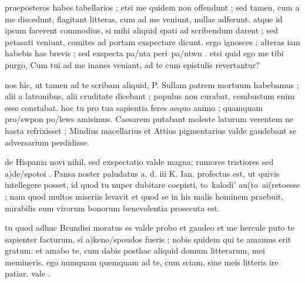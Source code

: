 


 praeposteros habes tabellarios ; etsi me quidem non offendunt ; sed tamen, cum a me discedunt, flagitant litteras, cum ad me veniunt, nullas adferunt. atque id ipsum facerent commodius, si mihi aliquid spati ad scribendum darent ; sed petasati veniunt, comites ad portam exspectare dicunt. ergo ignosces ; alteras iam habebis has brevis ; sed exspecta pa/nta peri\ pa/ntwn . etsi quid ego me tibi purgo, Cum tui ad me inanes veniant, ad te cum epistulis revertantur?

 nos hic, ut tamen ad te scribam aliquid, P. Sullam patrem mortuum habebamus ; alii a latronibus, alii cruditate dicebant ; populus non curabat, combustum enim esse constabat. hoc tu pro tua sapientia feres aequo animo ; quamquam pro/swpon po/lews amisimus. Caesarem putabant moleste laturum verentem ne hasta refrixisset ; Mindius macellarius et Attius pigmentarius valde gaudebant se adversarium perdidisse.

 de Hispania novi nihil, sed exspectatio valde magna; rumores tristiores sed a)de/spotoi . Pansa noster paludatus a. d. iii K. Ian. profectus est, ut quivis intellegere posset, id quod tu nuper dubitare coepisti, to\ kalo\n di' au(to\ ai(reto\n esse ; nam quod multos miseriis levavit et quod se in his malis hominem praebuit, mirabilis eum virorum bonorum benevolentia prosecuta est.

 tu quod adhuc Brundisi moratus es valde probo et gaudeo et me hercule puto te sapienter facturum, si a)keno/spoudos fueris ; nobis quidem qui te amamus erit gratum. et amabo te, cum dabis posthac aliquid domum litterarum, mei memineris. ego numquam quemquam ad te, cum sciam, sine meis litteris ire patiar. vale .
